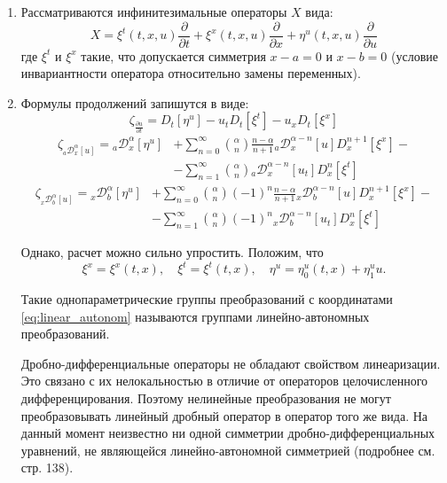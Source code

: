 \documentclass[a4paper, fontsize=14pt]{article}
\newcommand{\RLD}[3]{{}_{#1}\mathcal{D}_{#2}^{\alpha} \left[#3\right]} %
\newcommand{\D}[3]{D_{#1}^{#2} \left[ #3 \right]} %
\newcommand{\RLDa}[4]{{}_{#1}\mathcal{D}_{#2}^{#4} \left[#3\right]} %
\begin{document}
\begin{enumerate}
  \item Рассматриваются инфинитезимальные операторы $X$ вида:
  \begin{equation*}
    X = \xi^t(t, x, u) \frac{\partial}{\partial t}  + \xi^x(t, x, u)  \frac{\partial}{\partial x}  + \eta^u(t, x, u)  \frac{\partial}{\partial u}
  \end{equation*}
  где $\xi^t$ и $\xi^x$ такие, что допускается симметрия $x-a = 0$ и $x-b = 0$
  (условие инвариантности оператора относительно замены переменных).

  \item Формулы продолжений запишутся в виде:
\begin{equation}
  \label{eq:cont_t}
  \zeta_{\frac{\partial u}{\partial t}} = \D{t}{}{\eta^u} - u_t \D{t}{}{\xi^t}- u_x \D{t}{}{\xi^x}
\end{equation}
\begin{equation}
  \label{eq:cont_RL_left}
  \begin{split}\zeta_{\RLD{a}{x}{u}} = \RLD{a}{x}{\eta^u} &+ \sum_{n=0}^{\infty} \binom{\alpha}{n} \frac{n-\alpha}{n+1} \RLDa{a}{x}{u}{\alpha - n} \D{x}{n+1}{\xi^x} - \\
    &- \sum_{n=1}^{\infty} \binom{\alpha}{n} \RLDa{a}{x}{u_t}{\alpha-n} \D{x}{n}{\xi^t}
  \end{split}
\end{equation}
\begin{equation}
  \label{eq:cont_RL_right}
  \begin{split}\zeta_{\RLD{x}{b}{u}} = \RLD{x}{b}{\eta^u} &+ \sum_{n=0}^{\infty} \binom{\alpha}{n} (-1)^n \frac{n-\alpha}{n+1} \RLDa{x}{b}{u}{\alpha - n} \D{x}{n+1}{\xi^x} - \\
    &- \sum_{n=1}^{\infty} \binom{\alpha}{n} (-1)^n \RLDa{x}{b}{u_t}{\alpha-n} \D{x}{n}{\xi^t}
  \end{split}
\end{equation}

Однако, расчет можно сильно упростить. Положим, что
\begin{equation}
  \label{eq:linear_autonom}
  \xi^x = \xi^x(t, x), \quad \xi^t = \xi^t(t, x), \quad \eta^u = \eta_0^u(t, x) + \eta^u_1 u.
\end{equation}

Такие однопараметрические группы преобразований с координатами \eqref{eq:linear_autonom} называются группами линейно-автономных преобразований.

Дробно-дифференциальные операторы не обладают свойством линеаризации. Это связано с их нелокальностью в отличие от операторов целочисленного дифференцирования. Поэтому нелинейные преобразования не могут преобразовывать линейный дробный оператор в оператор того же вида. На данный момент неизвестно ни одной симметрии дробно-дифференциальных уравнений, не являющейся линейно-автономной симметрией (подробнее см. \cite{luka} стр. 138).


\end{enumerate}
\end{document}
